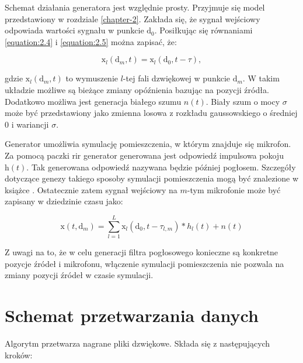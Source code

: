 \noindent Schemat działania generatora jest względnie prosty. Przyjmuje się model przedstawiony w rozdziale \ref{chapter-2}. Zakłada się, że sygnał wejściowy odpowiada wartości sygnału w punkcie $\bm{\mathrm{d}}_{0}$. Posiłkując się równaniami \eqref{equation:2.4} i \eqref{equation:2.5} można zapisać, że:

\begin{equation}
    \label{equation:delay model}
    \mathrm{x}_{l}(\bm{\mathrm{d}}_{m},t) = 
    \mathrm{x}_{l}(\bm{\mathrm{d}}_{0},t-\tau),
\end{equation}

\noindent gdzie $\mathrm{x}_{l}(\bm{\mathrm{d}}_{m},t)$ to wymuszenie $l$-tej fali dzwiękowej w punkcie $\bm{\mathrm{d}}_{m}$. W takim układzie możliwe są bieżące zmiany opóźnienia bazując na pozycji źródła. Dodatkowo możliwa jest generacja białego szumu $n(t)$. Biały szum o mocy $\sigma$ może być przedstawiony jako zmienna losowa z rozkładu gaussowskiego o średniej 0 i wariancji $\sigma$.

\noindent Generator umożliwia symulację pomieszczenia, w  którym znajduje się mikrofon. Za pomocą paczki rir generator \cite{rir} generowana jest odpowiedź impulsowa pokoju $\bm{\mathrm{h}}(t)$. Tak generowana odpowiedź nazywana będzie później pogłosem. Szczegóły dotyczące genezy takiego sposoby symulacji pomieszczenia mogą być znalezione w książce \cite{Kuttruff}. Ostatecznie zatem sygnał wejściowy na $m$-tym mikrofonie może być zapisany w dziedzinie czasu jako:

\begin{equation}
    \label{equation:full generator}
    \mathrm{x}(t,\bm{\mathrm{d}}_{m})=
    \sum_{l=1}^{L}
    \mathrm{x}_{l}(\bm{\mathrm{d}}_{0},t-\tau_{l,m})*
    h_{l}(t)+ n(t)
\end{equation}

\noindent Z uwagi na to, że w celu generacji filtra pogłosowego konieczne są konkretne pozycje źródeł i mikrofonu, włączenie symulacji pomieszczenia nie pozwala na zmiany pozycji źródeł w czasie symulacji.




\section{Schemat przetwarzania danych}

Algorytm przetwarza nagrane pliki dzwiękowe. Składa się z następujących kroków:

